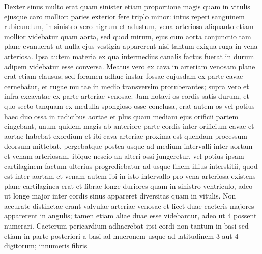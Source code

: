 \pstart%
Dexter sinus multo 
erat quam sinister etiam proportione magis quam in vitulis ejusque caro mollior: paries exterior fere triplo minor: intus reperi sanguinem rubicundum, in sinistro vero nigrum et adustum, vena arteriosa aliquanto etiam mollior videbatur quam aorta, sed quod mirum, ejus cum aorta conjunctio tam plane evanuerat ut nulla ejus vestigia apparerent nisi tantum exigua ruga in vena arteriosa. Ipsa autem materia ex qua intermedius canalis factus fuerat in durum adipem videbatur esse conversa. Meatus vero ex cava in arteriam venosam plane erat etiam clausus; sed foramen adhuc instar fossae cujusdam ex parte cavae cernebatur, et rugae multae in medio transversim protuberantes; supra vero et infra excavatae ex parte arteriae venosae.
\pend%
\pstart%
Jam notavi os cordis satis durum, et quo secto
tanquam ex medulla spongioso osse conclusa, erat autem
os vel potius haec duo ossa in radicibus aortae et plus quam mediam ejus orificii partem cingebant, unum quidem magis ab anteriore parte cordis inter orificium cavae et aortae habebat exordium et ibi cava arteriae proxima est quendam processum deorsum mittebat, pergebatque postea usque ad medium intervalli inter aortam et venam arteriosam, ibique nescio an alteri ossi jungeretur, vel potius ipsam cartilaginem factum ulterius progrediebatur ad usque finem illius interstitii, quod est inter aortam et venam
autem ibi in isto intervallo pro vena arteriosa existens plane cartilaginea erat et fibrae longe duriores quam in sinistro ventriculo, adeo ut longe major inter cordis sinus appareret diversitas quam in vitulis.
\pend 
\pstart Non accurate distinctae erant valvulae arteriae venosae et licet duae caeteris majores apparerent in angulis; tamen etiam aliae duae esse videbantur, adeo ut 4 possent numerari.
\pend%
\pstart%
Caeterum pericardium adhaerebat ipsi cordi non tantum in basi sed etiam in parte posteriori a basi ad mucronem usque ad latitudinem 3 aut 4 digitorum; innumeris fibris
